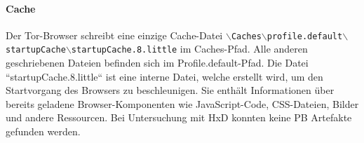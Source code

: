 \begin{appendices}
		\paragraph*{Cache}
		Der Tor-Browser schreibt eine einzige Cache-Datei \texttt{$\backslash$Caches$\backslash$profile.default$\backslash$\\startupCache$\backslash$startupCache.8.little} im Caches-Pfad. Alle anderen geschriebenen Dateien befinden sich im Profile.default-Pfad.
		Die Datei ``startupCache.8.little`` ist eine interne Datei, welche erstellt wird, um den Startvorgang des Browsers zu beschleunigen. Sie enthält Informationen über bereits geladene Browser-Komponenten wie JavaScript-Code, CSS-Dateien, Bilder und andere Ressourcen. \cite{MozillaWiki.05.06.2023} 
		Bei Untersuchung mit HxD konnten keine PB Artefakte gefunden werden.
		

\end{appendices}
